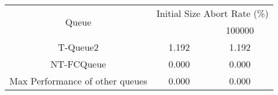 \begin{tabular}{|c|c|c|}
\hline
\multirow{2}{*}{Queue} & \multicolumn{2}{c|}{Initial Size Abort Rate (\%)}\\\cline{2-3}& \quad 10000 \quad & 100000\\
\hline
\hline
T-Queue2 & 1.192 & 1.192\\
NT-FCQueue & 0.000 & 0.000\\
Max Performance of other queues & 0.000 & 0.000\\
\hline\end{tabular}
